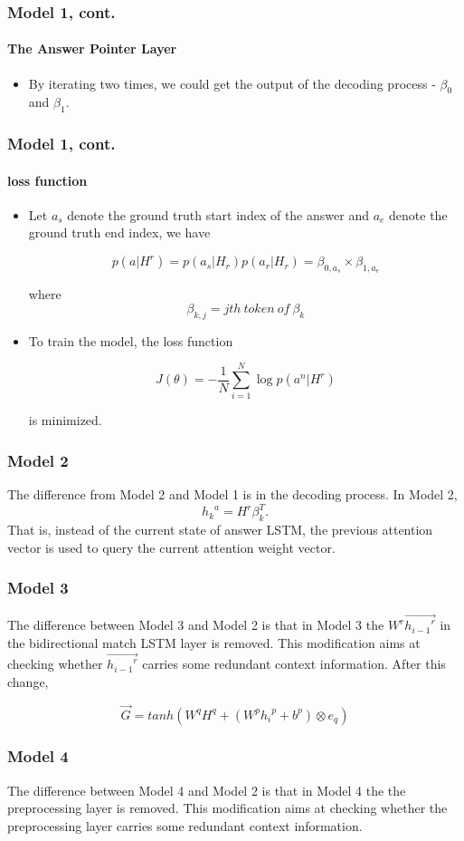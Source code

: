 \documentclass{beamer}
\begin{document}
\begin{frame}\frametitle{Model 1, cont.}\framesubtitle{The Answer Pointer Layer}
    \begin{itemize}
        \item By iterating two times, we could get the output of the decoding process - $\beta _0$ and $\beta _1$.
    \end{itemize}

\end{frame}

\begin{frame}\frametitle{Model 1, cont.}\framesubtitle{loss function}
    \begin{itemize}
        \item Let $a_s$ denote the ground truth start index of the answer and $a_e$ denote the ground truth end index, we have

        $$p(a|H^r) = p(a_s|H_r)p(a_r|H_r)=\beta _{0, a_s} \times \beta_{1, a_e}$$

        where $$\beta_{k, j} = jth\ token\ of\ \beta _k$$
        \item To train the model, the loss function

        $$J(\theta) = -\frac{1}{N}\sum_{i=1}^{N} \log{p(a^n|H^r)} $$

        is minimized.

    \end{itemize}

\end{frame}

\begin{frame} \frametitle{Model 2}
    The difference from Model 2 and Model 1 is in the decoding process. In Model 2,
    $${h_k}^a = H^r\beta _{k}^T.$$
    That is, instead of the current state of answer LSTM, the previous attention vector is used to query the current attention weight vector.
\end{frame}

\begin{frame} \frametitle{Model 3}
    The difference between Model 3 and Model 2 is that in Model 3 the $W^r\overrightarrow{{h_{i-1}}^r}$ in the bidirectional match LSTM layer is removed. This modification aims at checking whether $\overrightarrow{{h_{i-1}}^r}$ carries some redundant context information. After this change,


    $$\overrightarrow{G} = tanh(W^qH^q + (W^p{h_i}^p + b^p) \otimes e_q)$$
\end{frame}

\begin{frame} \frametitle{Model 4}
    The difference between Model 4 and Model 2 is that in Model 4 the the preprocessing layer is removed. This modification aims at checking whether the preprocessing layer carries some redundant context information.
\end{frame}
\end{document}

